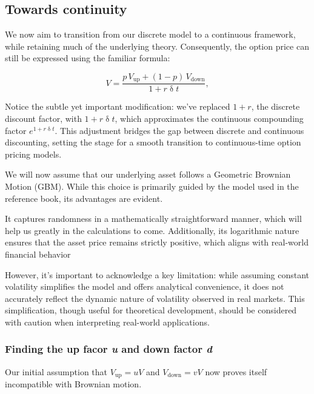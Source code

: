 \documentclass{article}
\begin{document}
    \subsection{Towards continuity}

    We now aim to transition from our discrete model to a continuous framework, while retaining much of the underlying theory.
    Consequently, the option price can still be expressed using the familiar formula:

    \begin{equation}
        \label{eq:option_price}
        V = \frac{p \, V_{\text{up}} + (1 - p) \, V_{\text{down}}}{1 + r \updelta t},
    \end{equation}

    Notice the subtle yet important modification: we've replaced $1 + r$, the discrete discount factor, with $1 + r \updelta t$, which approximates the continuous compounding factor $e^{1 + r \updelta t}$.
    This adjustment bridges the gap between discrete and continuous discounting, setting the stage for a smooth transition to continuous-time option pricing models.

    We will now assume that our underlying asset follows a Geometric Brownian Motion (GBM).
    While this choice is primarily guided by the model used in the reference book, its advantages are evident.

    It captures randomness in a mathematically straightforward manner, which will help us greatly in the calculations to come.
    Additionally, its logarithmic nature ensures that the asset price remains strictly positive, which aligns with real-world financial behavior

    However, it’s important to acknowledge a key limitation: while assuming constant volatility simplifies the model and offers analytical convenience, it does not accurately reflect the dynamic nature of volatility observed in real markets.
    This simplification, though useful for theoretical development, should be considered with caution when interpreting real-world applications.

    \subsubsection{Finding the up facor \emph{u} and down factor \emph{d}}

    Our initial assumption that $V_{\text{up}} = u V$ and $V_{\text{down}} = v V$ now proves itself incompatible with Brownian motion.
\end{document}
